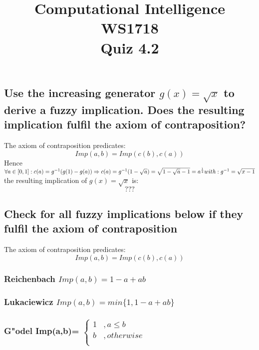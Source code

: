 \documentclass{article}
\author{}
\title{
    Computational Intelligence WS1718\\
    Quiz 4.2
}
\date{}
\begin{document}
\maketitle

\subsection{Use the increasing generator $g(x)= \sqrt x$ to derive a fuzzy implication. Does the resulting implication fulfil the axiom of contraposition?}
The axiom of contraposition predicates:\\
$$
Imp(a, b) = Imp( c(b), c(a) )
$$
Hence\\
$
\forall a \in [0,1] : c(a) = g^{-1}(g(1)-g(a))\\
\Rightarrow c(a)
    = g^{-1}(1-\sqrt a)
    = \sqrt{1-\sqrt a - 1}
    =  a^{\frac{1}{4}}
\\
with:\\
g^{-1} = \sqrt{x-1}\\
$
\\
the resulting implication of $g(x)= \sqrt x$ is:
$$
???
$$

\subsection{Check for all fuzzy implications below if they fulfil the axiom of contraposition}
The axiom of contraposition predicates:\\
$$
Imp(a, b) = Imp( c(b), c(a) )
$$
\subsubsection{Reichenbach $Imp(a,b) = 1-a + ab$}
\subsubsection{Lukaciewicz $Imp(a,b) = min\{1, 1-a + ab\}$}

\subsubsection{
    G"odel Imp(a,b)= $\begin{cases} 1&, a \leq b\\ b&, otherwise\\ \end{cases}$
}
\end{document}
